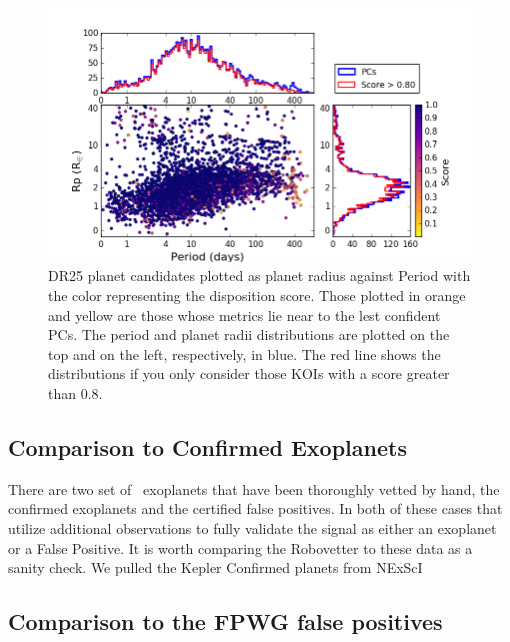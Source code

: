 \begin{figure}
    \centering
    \includegraphics[width=1.1\linewidth]{fig-radiusPeriodScore-hist.png}
    \caption{DR25 planet candidates plotted as planet radius against Period with the color representing the disposition score. Those plotted in orange and yellow are those whose metrics lie near to the lest confident PCs.  The period and planet radii distributions are plotted on the top and on the left, respectively, in blue. The red line shows the distributions if you only consider those KOIs with a score greater than 0.8. }
    \label{f:catalogPlot}
\end{figure}






\subsection{Comparison to Confirmed Exoplanets}
There are two set of \Kepelr\ exoplanets that have been thoroughly vetted by hand, the confirmed exoplanets and the certified false positives.  In both of these cases that utilize additional observations to fully validate the signal as either an exoplanet or a False Positive.  It is worth comparing the Robovetter to these data as a sanity check.  We pulled the Kepler Confirmed planets from NExScI

\subsection{Comparison to the FPWG false positives}



